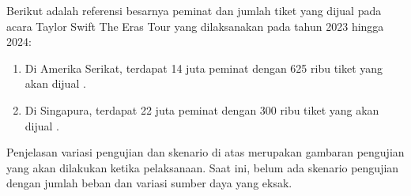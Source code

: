 Berikut adalah referensi besarnya peminat dan jumlah tiket yang dijual pada acara Taylor Swift The Eras Tour yang dilaksanakan pada tahun 2023 hingga 2024:

\begin{enumerate}
    \item Di Amerika Serikat, terdapat 14 juta peminat dengan 625 ribu tiket yang akan dijual \parencite{USTaylorSwift}.
    \item Di Singapura, terdapat 22 juta peminat dengan 300 ribu tiket yang akan dijual \parencite{asiaTaylorSwift}.
\end{enumerate}

Penjelasan variasi pengujian dan skenario di atas merupakan gambaran pengujian yang akan dilakukan ketika pelaksanaan. Saat ini, belum ada skenario pengujian dengan jumlah beban dan variasi sumber daya yang eksak.